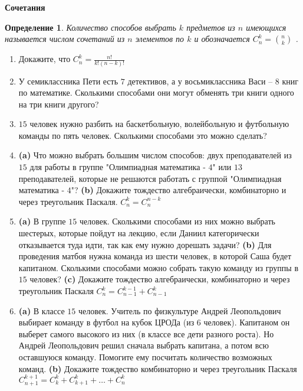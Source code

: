 \documentclass{article}
\newtheorem{definition}{Определение}
\begin{document}
\large
	
\begin{center}
	\textbf{Сочетания}
\end{center}

\begin{definition}
	Количество способов выбрать $k$ предметов из $n$ имеющихся называется числом сочетаний из $n$ элементов по $k$ и обозначается $C^k_n = \binom{n}{k}$ .
\end{definition}

\begin{enumerate}[label*=\protect\fbox{\arabic{enumi}}]
\item Докажите, что $C^k_n = \frac{n!}{k!(n - k)!}$

\item У семиклассника Пети есть $7$ детективов, а у восьмиклассника Васи – $8$ книг по математике. Сколькими способами они могут обменять три книги одного на три книги другого?

\item $15$ человек нужно разбить на баскетбольную, волейбольную и футбольную команды по пять человек. Сколькими способами это можно сделать?

\item \textbf{(a)} Что можно выбрать большим числом способов: двух преподавателей из $15$ для работы
в группе "Олимпиадная математика - $4$" или $13$ преподавателей, которые не решаются работать с группой "Олимпиадная математика - $4$"? \textbf{(b)} Докажите тождество алгебраически, комбинаторно и через треугольник Паскаля. $C^k_n = C^{n-k}_n$

\item \textbf{(a)} В группе $15$ человек. Сколькими способами из них можно выбрать шестерых, которые пойдут на лекцию, если Даниил категорически отказывается туда идти, так как ему нужно дорешать задачи? \textbf{(b)} Для проведения матбоя нужна команда из шести человек, в которой Саша будет капитаном. Сколькими способами можно собрать такую команду из группы в $15$ человек? \textbf{(c)} Докажите тождество алгебраически, комбинаторно и через треугольник Паскаля $C^k_n = C^{k-1}_{n - 1} + C^k_{n- 1}$

\item \textbf{(a)} В классе $15$ человек. Учитель по физкультуре Андрей Леопольдович выбирает команду в футбол на кубок ЦРОДа (из 6 человек). Капитаном он выберет самого высокого из них (в классе все дети разного роста). Но Андрей Леопольдович решил сначала выбрать капитана, а потом всю оставшуюся команду. Помогите ему посчитать количество возможных команд. \textbf{(b)} Докажите тождество комбинаторно и через треугольник Паскаля $C^{k + 1}_{n + 1} = C^{k}_{k} + C^{k}_{k + 1} + \dotso + C^k_{n}$


\end{enumerate}
\end{document}
